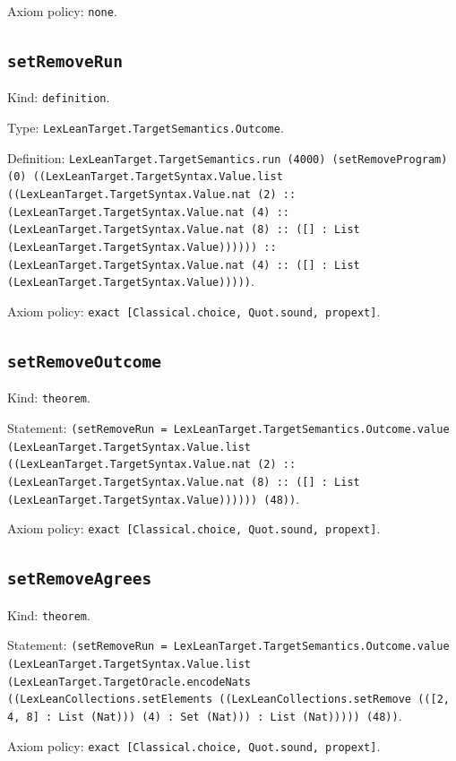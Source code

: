 \documentclass[11pt]{article}
\begin{document}
\noindent Axiom policy: \texttt{none}.\par
\subsection*{\texttt{setRemoveRun}}
\noindent Kind: \texttt{definition}.\par
\noindent Type: \texttt{LexLeanTarget.TargetSemantics.Outcome}.\par
\noindent Definition: \texttt{LexLeanTarget.TargetSemantics.run (4000) (setRemoveProgram) (0) ((LexLeanTarget.TargetSyntax.Value.list ((LexLeanTarget.TargetSyntax.Value.nat (2) :: (LexLeanTarget.TargetSyntax.Value.nat (4) :: (LexLeanTarget.TargetSyntax.Value.nat (8) :: ([] : List (LexLeanTarget.TargetSyntax.Value)))))) :: (LexLeanTarget.TargetSyntax.Value.nat (4) :: ([] : List (LexLeanTarget.TargetSyntax.Value)))))}.\par
\noindent Axiom policy: \texttt{exact [Classical.choice, Quot.sound, propext]}.\par
\subsection*{\texttt{setRemoveOutcome}}
\noindent Kind: \texttt{theorem}.\par
\noindent Statement: \texttt{(setRemoveRun = LexLeanTarget.TargetSemantics.Outcome.value (LexLeanTarget.TargetSyntax.Value.list ((LexLeanTarget.TargetSyntax.Value.nat (2) :: (LexLeanTarget.TargetSyntax.Value.nat (8) :: ([] : List (LexLeanTarget.TargetSyntax.Value)))))) (48))}.\par
\noindent Axiom policy: \texttt{exact [Classical.choice, Quot.sound, propext]}.\par
\subsection*{\texttt{setRemoveAgrees}}
\noindent Kind: \texttt{theorem}.\par
\noindent Statement: \texttt{(setRemoveRun = LexLeanTarget.TargetSemantics.Outcome.value (LexLeanTarget.TargetSyntax.Value.list (LexLeanTarget.TargetOracle.encodeNats ((LexLeanCollections.setElements ((LexLeanCollections.setRemove (([2, 4, 8] : List (Nat))) (4) : Set (Nat))) : List (Nat))))) (48))}.\par
\noindent Axiom policy: \texttt{exact [Classical.choice, Quot.sound, propext]}.\par
\end{document}
